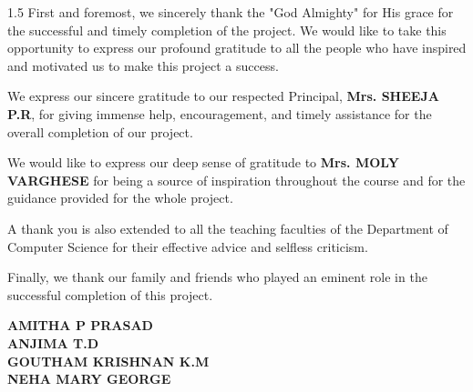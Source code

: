 \documentclass[12pt, a4paper, oneside]{report}
\begin{document}
\begin{spacing}{1.5}
First and foremost, we sincerely thank the "God Almighty" for His grace for the successful and timely completion of the project. We would like to take this opportunity to express our profound gratitude to all the people who have inspired and motivated us to make this project a success.

We express our sincere gratitude to our respected Principal, \textbf{Mrs. SHEEJA P.R}, for giving immense help, encouragement, and timely assistance for the overall completion of our project.

We would like to express our deep sense of gratitude to \textbf{Mrs. MOLY VARGHESE} for being a source of inspiration throughout the course and for the guidance provided for the whole project.

A thank you is also extended to all the teaching faculties of the Department of Computer Science for their effective advice and selfless criticism. 

Finally, we thank our family and friends who played an eminent role in the successful completion of this project.
\end{spacing}
\vspace{1cm}
\begin{flushright}
    \textbf{AMITHA P PRASAD} \\
    \textbf{ANJIMA T.D} \\
    \textbf{GOUTHAM KRISHNAN K.M} \\
    \textbf{NEHA MARY GEORGE}
\end{flushright}
\newpage
\end{document}
